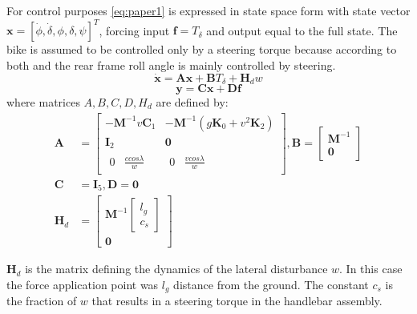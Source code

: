  For control purposes \cref{eq:paper1} is expressed in state space form with state vector \ensuremath{\mathbf{x}=[\dot{\phi}, \dot{\delta}, \phi, \delta, \psi]^{T}}, forcing input \ensuremath{\mathbf{f}=T_{\delta}} and output equal to the full state. The  bike is assumed to be controlled only by a steering torque because according to both \citet{moore2012human} and \citet{weir1973manual}  the rear frame roll angle is mainly
 controlled by steering. 
 \begin{equation}
    \dot{\mathbf{x}}=\mathbf{A} \mathbf{x}+\mathbf{B} T_\delta + \mathbf{H}_d w
    \label{eq:bikeEOM}
\end{equation}
\begin{equation}
    \mathbf{y}=\mathbf{C} \mathbf{x}+\mathbf{D} \mathbf{f}
\end{equation}
where matrices \ensuremath{A,B,C,D,H_d} are defined by:
\begin{align}
    \mathbf{A} &=\begin{bmatrix}
        -\mathbf{M}^{-1}v\mathbf{C}_{1} & -\mathbf{M}^{-1}(g \mathbf{K}_{0}+v^{2}\mathbf{K}_{2}) \\
        {\mathbf{I}_2}                    & {\mathbf{0}} \\  {\begin{matrix} {0} & { \frac{c cos\lambda}{w}}\end{matrix}} &  {\begin{matrix} 0 & { \frac{v cos\lambda}{w}}\end{matrix} } 
    \end{bmatrix} , \mathbf{B}=\left[ \begin{array}{c}{\mathbf{M}^{-1}} \\ {\mathbf{0}}\end{array}\right] \\
    \mathbf{C} &= {\mathbf{I}_5} , \mathbf{D}=\mathbf{0} \\
    \mathbf{H}_d &= \left[ \begin{array}{c}{\mathbf{M}^{-1}}{\begin{bmatrix} l_g \\ c_s\end{bmatrix} }  \\ {\mathbf{0}}\end{array}\right] 
\end{align}

\ensuremath{\mathbf{H}_d} is the matrix defining the dynamics of the lateral disturbance \ensuremath{w}. In this case the force application point was \ensuremath{l_g} distance from the ground. The constant \ensuremath{c_s} is the fraction of \ensuremath{w} that results in a steering torque in the handlebar assembly.

